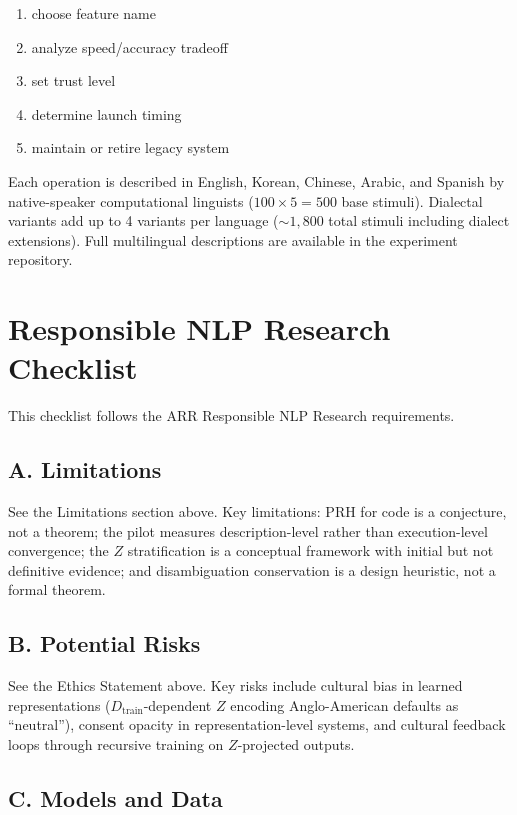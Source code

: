 \documentclass[11pt]{article}
\theoremstyle{definition}
\newcommand{\Dtrain}{D_{\text{train}}}
\begin{document}
\begin{enumerate}[nosep]
politely \item choose feature name \item analyze speed/accuracy tradeoff \item set trust level \item determine launch timing \item maintain or retire legacy system
\end{enumerate}
\normalsize

Each operation is described in English, Korean, Chinese, Arabic, and Spanish by native-speaker computational linguists ($100 \times 5 = 500$ base stimuli). Dialectal variants add up to 4 variants per language (${\sim}1{,}800$ total stimuli including dialect extensions). Full multilingual descriptions are available in the experiment repository.


\section*{Responsible NLP Research Checklist}

This checklist follows the ARR Responsible NLP Research requirements.

\subsection*{A. Limitations}
See the Limitations section above. Key limitations: PRH for code is a conjecture, not a theorem; the pilot measures description-level rather than execution-level convergence; the $Z$ stratification is a conceptual framework with initial but not definitive evidence; and disambiguation conservation is a design heuristic, not a formal theorem.

\subsection*{B. Potential Risks}
See the Ethics Statement above. Key risks include cultural bias in learned representations ($\Dtrain$-dependent $Z$ encoding Anglo-American defaults as ``neutral''), consent opacity in representation-level systems, and cultural feedback loops through recursive training on $Z$-projected outputs.

\subsection*{C. Models and Data}
\end{document}
